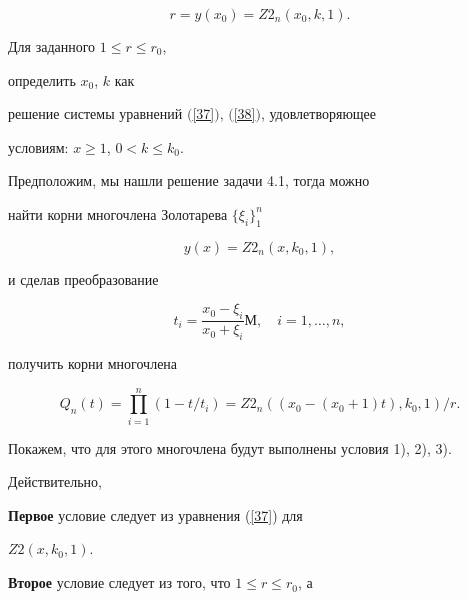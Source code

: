 \begin{equation}


r=y(x_0)=Z2_n(x_0,k,1).


\label{38}


\end{equation}





\begin{probs} Для заданного $1\le r\le r_0$,


определить $x_0$, $k$ как


решение системы уравнений $($\ref{37}$)$, $($\ref{38}$)$, удовлетворяющее


условиям: $x \ge 1$, $0<k\le k_0$.


\end{probs}





Предположим, мы нашли решение задачи 4.1, тогда можно


найти корни многочлена Золотарева $\{\xi_i\}_1^n$


$$


y(x)=Z2_n(x,k_0,1),


$$


и сделав преобразование


\begin{equation}


t_i= \frac{x_0-\xi_i}{x_0+\xi_i} М,\quad i=1,\dotsc ,n,


\label{39}


\end{equation}


получить корни многочлена


$$


Q_n(t)= \prod_{i=1}^{n} (1-t/t_i)=


Z2_n((x_0 - (x_0 +1)t),k_0,1)/r.


$$


Покажем, что для этого многочлена будут выполнены условия 1), 2), 3).


Действительно,





{\bf Первое} условие следует из уравнения (\ref{37}) для


$Z2(x,k_0,1)$.





{\bf Второе} условие следует из того, что $1\le r\le r_0$, а


